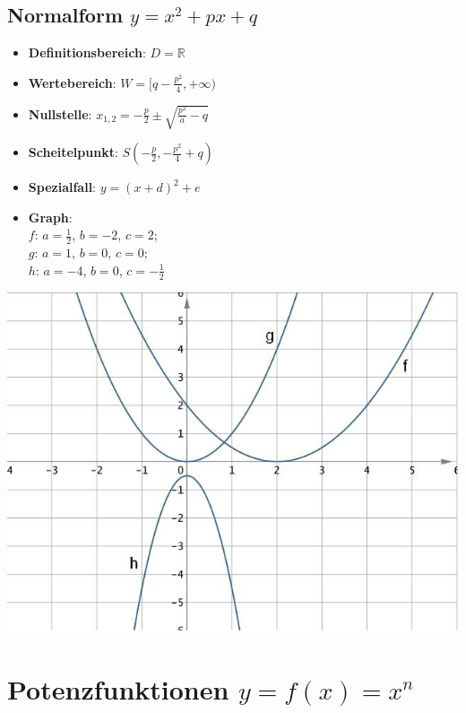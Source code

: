 \subsection*{Normalform $y = x^2 + px + q$}
\begin{itemize}
	\item \textbf{Definitionsbereich}: $ D = \mathbb{R} $
	\item \textbf{Wertebereich}: $ W = [q-\frac{p^2}{4}, +\infty) $
	\item \textbf{Nullstelle}: $ x_{1, 2}= - \frac{p}{2} \pm
\sqrt{\frac{p^2}{a}-q} $
	\item \textbf{Scheitelpunkt}: $ S(-\frac{p}{2}, -\frac{p^2}{4}+q )$
	\item \textbf{Spezialfall}: $y = (x+d)^2 +e $
	\item \textbf{Graph}: \\
		$f$: $a=\frac 1 2$, $b=-2$, $c=2$; \\
		$g$: $a=1$, $b=0$, $c=0$; \\
		$h$: $a=-4$, $b=0$, $c=-\frac 1 2$ \\
\end{itemize}
	\includegraphics[width=.6\textwidth]{img/QuadFkt.jpg}

\section*{Potenzfunktionen $ y = f(x) = x^n $}

